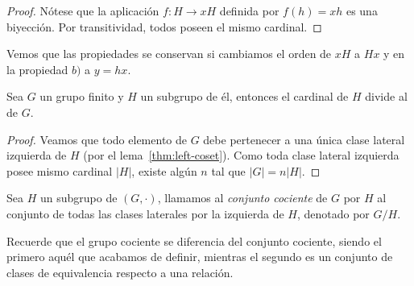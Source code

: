 \documentclass[11pt,oneside]{book}
\begin{document}
\begin{proof}
Nótese que la aplicación $f:H\rightarrow xH$ definida por $f(h)=xh$ es una biyección. Por transitividad, todos poseen el mismo cardinal.
\end{proof}
Vemos que las propiedades se conservan si cambiamos el orden de $xH$ a $Hx$ y en la propiedad $b)$ a $y=hx$.
\begin{thm}
Sea $G$ un grupo finito y $H$ un subgrupo de él, entonces el cardinal de $H$ divide al de $G$.
\end{thm}
\begin{proof}
Veamos que todo elemento de $G$ debe pertenecer a una única clase lateral izquierda de $H$ (por el lema~\ref{thm:left-coset}). Como toda clase lateral izquierda posee mismo cardinal $|H|$, existe algún $n$ tal que $|G|=n|H|$.
\end{proof}
\begin{mydef}
Sea $H$ un subgrupo de $(G,\cdot)$, llamamos al \textit{conjunto cociente} de $G$ por $H$ al conjunto de todas las clases laterales por la izquierda de $H$, denotado por $G/H$.
\end{mydef}
Recuerde que el grupo cociente se diferencia del conjunto cociente, siendo el primero aquél que acabamos de definir, mientras el segundo es un conjunto de clases de equivalencia respecto a una relación.
\end{document}
